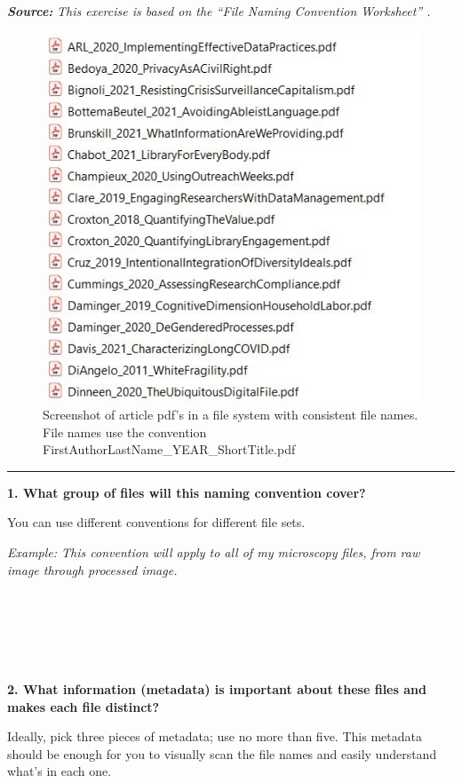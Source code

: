 \documentclass[
]{book}
\begin{document}
\textbf{\emph{Source:}} \emph{This exercise is based on the ``File Naming Convention Worksheet'' \citep{briney_file_2020}.}

\begin{figure}
\centering
\includegraphics{images/03_FileNaming.jpg}
\caption{Screenshot of article pdf's in a file system with consistent file names. File names use the convention FirstAuthorLastName\_YEAR\_ShortTitle.pdf}
\end{figure}

\begin{center}\rule{0.5\linewidth}{0.5pt}\end{center}

\textbf{1. What group of files will this naming convention cover?}

You can use different conventions for different file sets.

\emph{Example: This convention will apply to all of my microscopy files, from raw image through processed image.}

~

~

~

\textbf{2. What information (metadata) is important about these files and makes each file distinct?}

Ideally, pick three pieces of metadata; use no more than five. This metadata should be enough for you to visually scan the file names and easily understand what's in each one.
\end{document}
